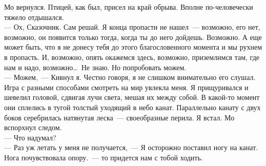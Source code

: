 Мо вернулся. Птицей, как был, присел на край обрыва. Вполне по-человечески 
тяжело отдышался.\\
--- Ох, Сказочник. Сам решай. Я конца пропасти не нашел~--- возможно, его нет, 
возможно, он появится только тогда, когда ты до него дойдешь. Возможно. А еще 
может быть, что я не донесу тебя до этого благословенного момента и мы рухнем в 
пропасть. И, возможно, опять окажемся здесь, возможно, приземлимся там, где нам 
и надо, возможно\ldots\ Не знаю. Но попробовать можем.\\
--- Можем,~--- Кивнул я. Честно говоря, я не слишком внимательно его слушал. Игра 
с разными способами смотреть на мир увлекла меня. Я прищуривался и шевелил 
головой, сдвигая лучи света, мешая их между собой. В какой-то момент они 
сплелись в тугой толстый уходящий в небо канат. Параллельно канату с двух боков 
серебрилась натянутая леска~--- своеобразные перила. Я встал. Мо вспорхнул 
следом.\\
--- Что надумал?\\
--- Раз уж летать у меня не получается,~--- Я осторожно поставил ногу на канат. 
Нога почувствовала опору.~--- то придется нам с тобой ходить.


